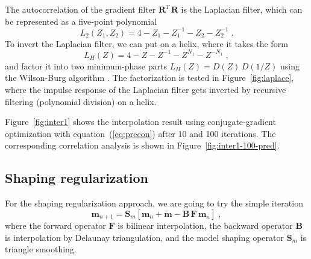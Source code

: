 The autocorrelation of the gradient filter $\mathbf{R}^T\,\mathbf{R}$
is the Laplacian filter, which can be represented as a five-point polynomial
\begin{equation}
\label{eq:lap2}
L_2(Z_1,Z_2) = 4 - Z_1 - Z_1^{-1} - Z_2 - Z_2^{-1}\;.
\end{equation} 
To invert the Laplacian filter, we can put on a helix, where it takes
the form
\begin{equation}
\label{eq:lap1}
L_H(Z) = 4 - Z - Z^{-1} - Z^{N_1} - Z^{-N_1}\;,
\end{equation} 
and factor it into two minimum-phase parts $L_H(Z) = D(Z)\,D(1/Z)$
using the Wilson-Burg algorithm \cite[]{burg}. The factorization is
tested in Figure~\ref{fig:laplace}, where the impulse response of the
Laplacian filter gets inverted by recursive filtering (polynomial
division) on a helix.



Figure~\ref{fig:inter1} shows the interpolation result using
conjugate-gradient optimization with equation~(\ref{eq:precon}) after
10 and 100 iterations. The corresponding correlation analysis is shown
in Figure~\ref{fig:inter1-100-pred}.


\subsection{Shaping regularization}

For the shaping regularization approach, we are going to try the simple iteration
\begin{equation}
\label{eq:mshape}
\mathbf{m}_{n+1} = \mathbf{S}_m\left[\mathbf{m}_{n} + \tilde{\mathbf{m}} -  \mathbf{B\,F\,m}_n\right]\;,
\end{equation}
where the forward operator $\mathbf{F}$ is bilinear interpolation, the
backward operator $\mathbf{B}$ is interpolation by Delaunay
triangulation, and the model shaping operator $\mathbf{S}_m$ is
triangle smoothing.

